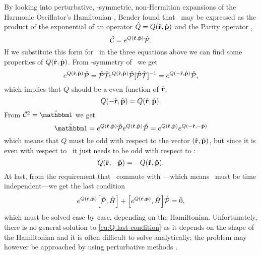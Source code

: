             By looking into perturbative, \PT-symmetric, non-Hermitian expansions of the Harmonic Oscillator's Hamiltonian \cite{bender2024}, Bender found that \hC\ may be expressed as the product of the exponential of an operator $\hQ = Q\pqty{\hvr,\hvp}$ and the Parity operator \hP,
            \begin{equation}
                \label{eq:C-exponential}
                \hC = \myexp{Q\pqty{\hvr,\hvp}}\hP
                \myperiod
            \end{equation}
            If we substitute this form for \hC\ in the three equations above we can find some properties of $Q\pqty{\hvr,\hvp}$. From \PT-symmetry of \hC\ we get
            \begin{equation*}
                \myexp{Q\pqty{\hvr,\hvp}}\hP
                = \PTtransform{\myexp{Q\pqty{\hvr,\hvp}}\hP}
                = \myexp{Q\pqty{-\hvr,\hvp}}\hP
                \mycomma
            \end{equation*}
            which implies that $Q$ should be a even function of $\hat{\vb{r}}$:
            \begin{equation}
                Q\pqty{-\hvr,\hvp} = Q\pqty{\hvr,\hvp}
                \myperiod
            \end{equation}
            From $\hC^2 = \hidM$ we get
            \begin{equation*}
                \hidM = \myexp{Q\pqty{\hvr,\hvp}} \hP \myexp{Q\pqty{\hvr,\hvp}} \hP = \myexp{Q\pqty{\hvr,\hvp}} \myexp{Q\pqty{-\hvr,-\hvp}}
            \end{equation*}
            which means that $Q$ must be odd with respect to the vector $\pqty{\hvr,\hvp}$, but since it is even with respect to \hvr\ it just needs to be odd with respect to {\hvp}:
            \begin{equation}
                Q\pqty{\hvr,-\hvp} = -Q\pqty{\hvr,\hvp}
                \myperiod
            \end{equation}
            At last, from the requirement that \hC\ commute with \hH---which means \hC\ must be time independent---we get the last condition
            \begin{equation}
                \label{eq:Q-last-condition}
                \myexp{Q\pqty{\hvr,\hvp}} \comm{\hP}{\hH} + \comm{\myexp{Q\pqty{\hvr,\hvp}}}{\hH} \hP = \hzero
                \mycomma
            \end{equation}
            which must be solved case by case, depending on the Hamiltonian. Unfortunately, there is no general solution to \eqref{eq:Q-last-condition} as it depends on the shape of the Hamiltonian and it is often difficult to solve analytically; the problem may however be approached by using perturbative methods \cite{bender2024}.

